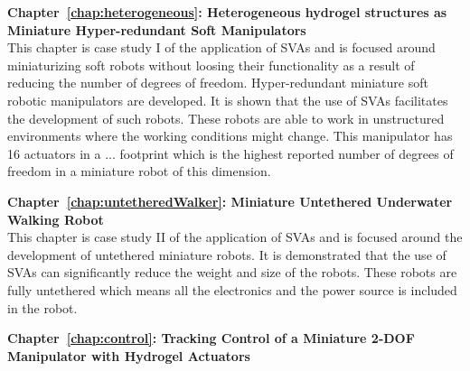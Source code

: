\textbf{Chapter~\ref{chap:heterogeneous}: Heterogeneous hydrogel structures as Miniature Hyper-redundant Soft Manipulators}\\
This chapter is case study I of the application of SVAs and is focused around miniaturizing soft robots without loosing their functionality as a result of reducing the number of degrees of freedom. Hyper-redundant miniature soft robotic manipulators are developed. It is shown that the use of SVAs facilitates the development of such robots. These robots are able to work in unstructured environments where the working conditions might change. This manipulator has 16 actuators in a ... footprint which is the highest reported number of degrees of freedom in a miniature robot of this dimension.

\textbf{Chapter~\ref{chap:untetheredWalker}: Miniature Untethered Underwater Walking Robot}\\
This chapter is case study II of the application of SVAs and is focused around the development of untethered miniature robots. It is demonstrated that the use of SVAs can significantly reduce the weight and size of the robots. These robots are fully untethered which means all the electronics and the power source is included in the robot. 

\textbf{Chapter~\ref{chap:control}: Tracking Control of a Miniature 2-DOF Manipulator with Hydrogel Actuators}



